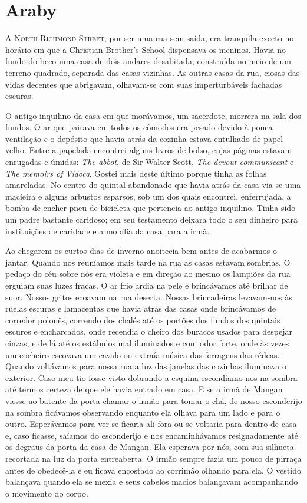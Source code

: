 \chapter{Araby}

\textsc{A North Richmond Street,} por ser uma rua sem saída, era tranquila exceto
no horário em que a Christian Brother's School dispensava os meninos.
Havia no fundo do beco uma casa de dois andares desabitada, construída
no meio de um terreno quadrado, separada das casas vizinhas. As outras
casas da rua, ciosas das vidas decentes que abrigavam, olhavam-se com
suas imperturbáveis fachadas escuras.

O antigo inquilino da casa em que morávamos, um sacerdote, morrera na
sala dos fundos. O ar que pairava em todos os cômodos era pesado
devido à pouca ventilação e o depósito que havia atrás da cozinha
estava entulhado de papel velho. Entre a papelada encontrei alguns
livros de bolso, cujas páginas estavam enrugadas e úmidas: \textit{The abbot},
de Sir Walter Scott, \textit{The devout communicant} e \textit{The memoirs of Vidocq}.
Gostei mais deste último porque tinha as folhas amareladas. No centro
do quintal abandonado que havia atrás da casa via-se uma macieira e
alguns arbustos esparsos, sob um dos quais encontrei, enferrujada, a
bomba de encher pneu de bicicleta que pertencia ao antigo inquilino.
Tinha sido um padre bastante caridoso; em seu testamento deixara todo
o seu dinheiro para instituições de caridade e a mobília da casa para
a irmã.

Ao chegarem os curtos dias de inverno anoitecia bem antes de acabarmos
o jantar. Quando nos reuníamos mais tarde na rua as casas estavam
sombrias. O pedaço do céu sobre nós era violeta e em direção ao mesmo
os lampiões da rua erguiam suas luzes fracas. O ar frio ardia na pele
e brincávamos até brilhar de suor. Nossos gritos ecoavam na rua
deserta. Nossas brincadeiras levavam-nos às ruelas escuras e
lamacentas que havia atrás das casas onde brincávamos de corredor
polonês, correndo dos chalés até os portões dos fundos dos quintais
escuros e encharcados, onde recendia o cheiro dos buracos usados para
despejar cinzas, e de lá até os estábulos mal iluminados e com odor
forte, onde às vezes um cocheiro escovava um cavalo ou extraía música
das ferragens das rédeas. Quando voltávamos para nossa rua a luz das
janelas das cozinhas iluminava o exterior. Caso meu tio fosse visto
dobrando a esquina escondíamo-nos na sombra até termos certeza de
que ele havia entrado em casa. E se a irmã de Mangan viesse ao batente
da porta chamar o irmão para tomar o chá, de nosso esconderijo na
sombra ficávamos observando enquanto ela olhava para um lado e para
o outro. Esperávamos para ver se ficaria ali fora ou se voltaria para
dentro de casa e, caso ficasse, saíamos do esconderijo e nos
encaminhávamos resignadamente até os degraus da porta da casa de
Mangan. Ela esperava por nós, com sua silhueta recortada na luz da
porta entreaberta. O irmão sempre fazia um pouco de pirraça antes de
obedecê-la e eu ficava encostado ao corrimão olhando para ela. O
vestido balançava quando ela se mexia e seus cabelos macios balançavam
acompanhando o movimento do corpo.

